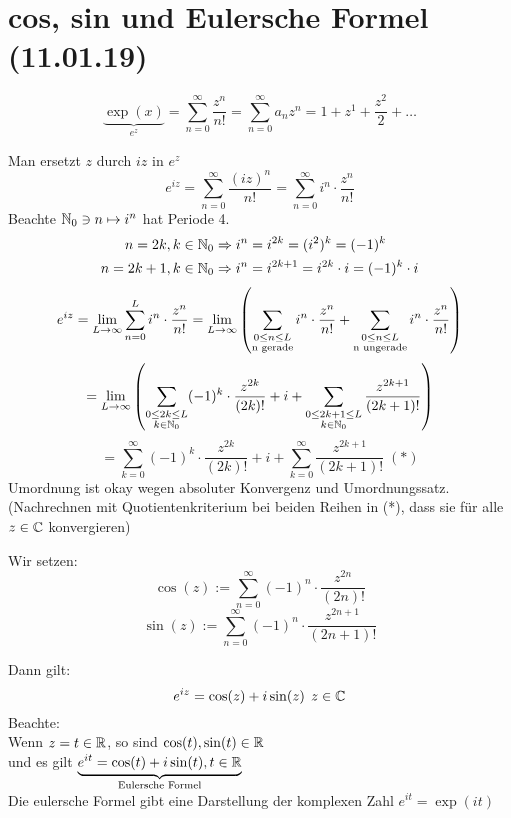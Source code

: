 \documentclass[../ana1u.tex]{subfiles}
\begin{document}
\setcounter{section}{8}

\section{cos, sin und Eulersche Formel (11.01.19)}
\begin{bem}
	\[\underbrace{\exp(x)}_{e^z} = \sum_{n=0}^{\infty} \frac{z^n}{n!} 
	= \sum_{n=0}^{\infty} a_n z^n = 1 + z^1 + \frac{z^2}{2} + \dots \]
\end{bem}
Man ersetzt \(z \) durch \(iz \) in \(e^z \)
\[e^{iz} = \sum_{n=0}^{\infty} \frac{(iz)^n}{n!} 
= \sum_{n=0}^{\infty} i^n \cdot \frac{z^n}{n!} \]
Beachte \(\mathbb{N}_0 \ni n \mapsto i^n \) hat Periode 4.
\begin{align*}
	n = 2k, k\in \mathbb{N}_0 &\Rightarrow i^n = i^{2k} = (i^2)^k = (-1)^k \\
	n = 2k+1, k \in \mathbb{N}_0 &\Rightarrow i^n = i^{2k+1} = i^{2k} \cdot i = (-1)^k \cdot i
\end{align*}
\[e^{iz} = \lim\limits_{L\rightarrow\infty} \sum_{n=0}^{L} i^n \cdot \frac{z^n}{n!} 
= \lim\limits_{L\rightarrow\infty} \left(\sum_{
	\substack{0 \leq n \leq L \\ \text{n gerade}}} 
	i^n \cdot \frac{z^n}{n!} + \sum_{\substack{0 \leq n \leq L \\ 
	\text{n ungerade}}} i^n \cdot \frac{z^n}{n!}\right) \]
\[= \lim\limits_{L\rightarrow\infty} \left(\sum_{
	\substack{0 \leq 2k \leq L \\ 
	k \in \mathbb{N}_0}} (-1)^k \cdot \frac{z^{2k}}{(2k)!} + i + \sum_{\substack{0 \leq 2k+1 \leq L \\ 
	k \in \mathbb{N}_0}} \frac{z^{2k+1}}{(2k+1)!} \right) \]
\[= \sum_{k=0}^{\infty} (-1)^k \cdot \frac{z^{2k}}{(2k)!} + i + 
\sum_{k=0}^{\infty} \frac{z^{2k+1}}{(2k+1)!} \; (*) \]
Umordnung ist okay wegen absoluter Konvergenz und Umordnungssatz. \\
(Nachrechnen mit Quotientenkriterium bei beiden Reihen in (*), dass sie für alle 
\(z \in \mathbb{C} \) konvergieren)
\begin{defi}
	Wir setzen:
	\[\cos(z) := \sum_{n=0}^{\infty} (-1)^n \cdot \frac{z^{2n}}{(2n)!} \]
	\[\sin(z) := \sum_{n=0}^{\infty} (-1)^n \cdot \frac{z^{2n+1}}{(2n+1)!} \]
\end{defi}
Dann gilt:
\[e^{iz} = \cos(z) + i\sin(z) \; \, z \in \mathbb{C} \]
Beachte:\\
Wenn \(z=t \in \mathbb{R} \), so sind \(\cos(t), \sin(t) \in \mathbb{R} \) \\
und es gilt 
\(\underbrace{e^{it} = \cos(t) + i\sin(t), t \in \mathbb{R}}_{\text{Eulersche Formel}} \) \\
Die eulersche Formel gibt eine Darstellung der komplexen Zahl \(e^{it} = \exp(it) \) 
\end{document}
